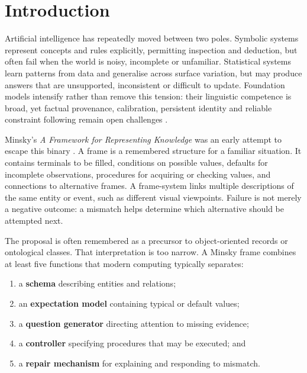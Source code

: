 \documentclass[11pt,a4paper]{article}
\begin{document}
\tableofcontents
\newpage
{}

\section{Introduction}

Artificial intelligence has repeatedly moved between two poles. Symbolic
systems represent concepts and rules explicitly, permitting inspection and
deduction, but often fail when the world is noisy, incomplete or unfamiliar.
Statistical systems learn patterns from data and generalise across surface
variation, but may produce answers that are unsupported, inconsistent or
difficult to update. Foundation models intensify rather than remove this
tension: their linguistic competence is broad, yet factual provenance,
calibration, persistent identity and reliable constraint following remain
open challenges \citep{bommasani2021opportunities,ji2023hallucination}.

Minsky's \emph{A Framework for Representing Knowledge} was an early attempt to
escape this binary \citep{minsky1975framework}. A frame is a remembered
structure for a familiar situation. It contains terminals to be filled,
conditions on possible values, defaults for incomplete observations, procedures
for acquiring or checking values, and connections to alternative frames. A
frame-system links multiple descriptions of the same entity or event, such as
different visual viewpoints. Failure is not merely a negative outcome: a
mismatch helps determine which alternative should be attempted next.

The proposal is often remembered as a precursor to object-oriented records or
ontological classes. That interpretation is too narrow. A Minsky frame combines
at least five functions that modern computing typically separates:

\begin{enumerate}
  \item a \textbf{schema} describing entities and relations;
  \item an \textbf{expectation model} containing typical or default values;
  \item a \textbf{question generator} directing attention to missing evidence;
  \item a \textbf{controller} specifying procedures that may be executed; and
  \item a \textbf{repair mechanism} for explaining and responding to mismatch.
\end{enumerate}
\end{document}
